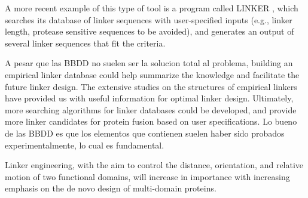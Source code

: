 A more recent example of this type of tool is a program called LINKER \cite{crasto2000linker,xue2004linker}, which searches its database of linker sequences with user-specified inputs (e.g., linker length, protease sensitive sequences to be avoided), and generates an output of several linker sequences that fit the criteria.


A pesar que las BBDD no suelen ser la solucion total al problema, building an empirical
linker database could help summarize the knowledge and facilitate the future linker design.
The extensive studies on the structures of empirical linkers have provided us with useful
information for optimal linker design. Ultimately, more searching algorithms for linker
databases could be developed, and provide more linker candidates for protein fusion based
on user specifications.
Lo bueno de las BBDD es que los elementos que contienen suelen haber sido probados experimentalmente, lo cual es fundamental.



Linker engineering, with the aim to control the distance, orientation, and relative motion of two functional domains, will increase in importance with increasing emphasis on the de novo design of multi-domain proteins.

